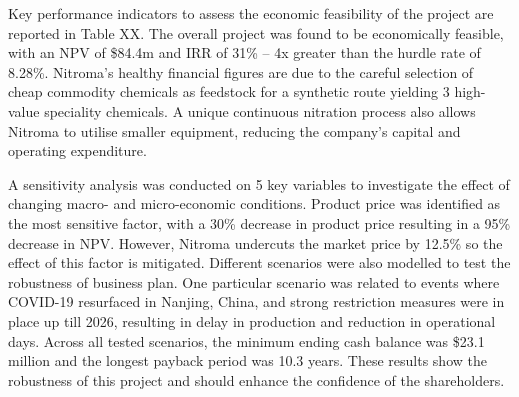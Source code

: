 Key performance indicators to assess the economic feasibility of the project are reported in Table XX. The overall project was found to be economically feasible, with an NPV of \$84.4m and IRR of 31\% – 4x greater than the hurdle rate of 8.28\%. Nitroma’s healthy financial figures are due to the careful selection of cheap commodity chemicals as feedstock for a synthetic route yielding 3 high-value speciality chemicals. A unique continuous nitration process also allows Nitroma to utilise smaller equipment, reducing the company’s capital and operating expenditure.

A sensitivity analysis was conducted on 5 key variables to investigate the effect of changing macro- and micro-economic conditions. Product price was identified as the most sensitive factor, with a 30\% decrease in product price resulting in a 95\% decrease in NPV. However, Nitroma undercuts the market price by 12.5\% so the effect of this factor is mitigated. Different scenarios were also modelled to test the robustness of business plan. One particular scenario was related to events where COVID-19 resurfaced in Nanjing, China, and strong restriction measures were in place up till 2026, resulting in delay in production and reduction in operational days. Across all tested scenarios, the minimum ending cash balance was \$23.1 million and the longest payback period was 10.3 years. These results show the robustness of this project and should enhance the confidence of the shareholders.